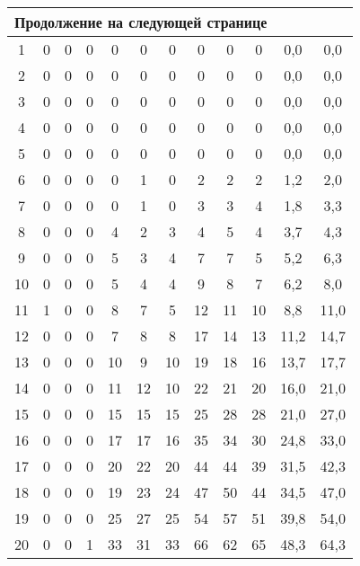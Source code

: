 \begin{center}
\begin{longtable}{|c|c|c|c|c|c|c|c|c|c|c|c|}
		\hline \multicolumn{12}{|l|}{{Продолжение на следующей странице}} \\ \hline
		\endfoot
		
		\hline \hline
		\endlastfoot
		
		1  & 0 & 0 & 0 & 0  & 0  & 0  & 0   & 0   & 0   & 0,0      & 0,0    \\ \hline
		2  & 0 & 0 & 0 & 0  & 0  & 0  & 0   & 0   & 0   & 0,0      & 0,0    \\ \hline
		3  & 0 & 0 & 0 & 0  & 0  & 0  & 0   & 0   & 0   & 0,0      & 0,0    \\ \hline
		4  & 0 & 0 & 0 & 0  & 0  & 0  & 0   & 0   & 0   & 0,0      & 0,0    \\ \hline
		5  & 0 & 0 & 0 & 0  & 0  & 0  & 0   & 0   & 0   & 0,0      & 0,0    \\ \hline
		6  & 0 & 0 & 0 & 0  & 1  & 0  & 2   & 2   & 2   & 1,2      & 2,0    \\ \hline
		7  & 0 & 0 & 0 & 0  & 1  & 0  & 3   & 3   & 4   & 1,8      & 3,3    \\ \hline
		8  & 0 & 0 & 0 & 4  & 2  & 3  & 4   & 5   & 4   & 3,7      & 4,3    \\ \hline
		9  & 0 & 0 & 0 & 5  & 3  & 4  & 7   & 7   & 5   & 5,2      & 6,3    \\ \hline
		10 & 0 & 0 & 0 & 5  & 4  & 4  & 9   & 8   & 7   & 6,2      & 8,0    \\ \hline
		11 & 1 & 0 & 0 & 8  & 7  & 5  & 12  & 11  & 10  & 8,8      & 11,0   \\ \hline
		12 & 0 & 0 & 0 & 7  & 8  & 8  & 17  & 14  & 13  & 11,2     & 14,7   \\ \hline
		13 & 0 & 0 & 0 & 10 & 9  & 10 & 19  & 18  & 16  & 13,7     & 17,7   \\ \hline
		14 & 0 & 0 & 0 & 11 & 12 & 10 & 22  & 21  & 20  & 16,0     & 21,0   \\ \hline
		15 & 0 & 0 & 0 & 15 & 15 & 15 & 25  & 28  & 28  & 21,0     & 27,0   \\ \hline
		16 & 0 & 0 & 0 & 17 & 17 & 16 & 35  & 34  & 30  & 24,8     & 33,0   \\ \hline
		17 & 0 & 0 & 0 & 20 & 22 & 20 & 44  & 44  & 39  & 31,5     & 42,3   \\ \hline
		18 & 0 & 0 & 0 & 19 & 23 & 24 & 47  & 50  & 44  & 34,5     & 47,0   \\ \hline
		19 & 0 & 0 & 0 & 25 & 27 & 25 & 54  & 57  & 51  & 39,8     & 54,0   \\ \hline
		20 & 0 & 0 & 1 & 33 & 31 & 33 & 66  & 62  & 65  & 48,3     & 64,3   \\ \hline

\end{longtable}
\end{center}
